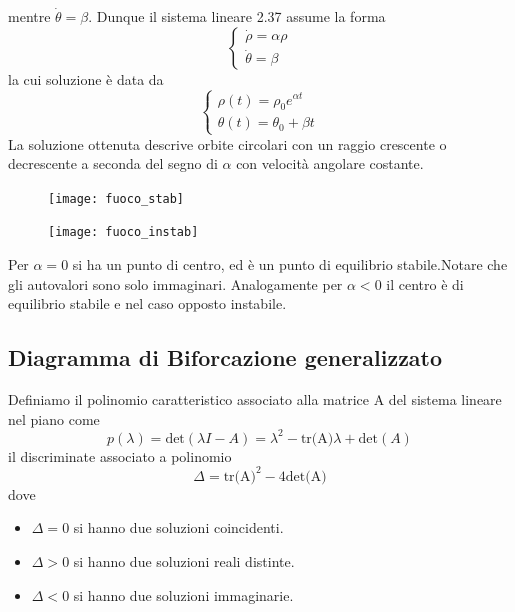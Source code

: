 mentre $\dot{\theta} = \beta$. Dunque il sistema lineare 2.37 assume la forma
\begin{equation}
	\left \{ \begin{array}{l}
		\dot{\rho} = \alpha \rho \\
		\dot{\theta} = \beta
	\end{array} \right.
\end{equation}
la cui soluzione \`{e} data da 
\begin{equation*}
	\left \{ \begin{array}{l}
		\rho(t) = \rho_0 e^{\alpha t}\\
		\theta(t) = \theta_0 + \beta t	
	\end{array} \right.
\end{equation*}
La soluzione ottenuta descrive orbite circolari con un raggio crescente o decrescente a seconda del segno di $\alpha$ con velocit\`{a} angolare costante.
\begin{figure}[!ht]
\centering
\begin{minipage}{.5\textwidth}
  \centering
  \texttt{[image: fuoco\_stab]}
  \end{minipage}%
\begin{minipage}{.5\textwidth}
  \centering
  \texttt{[image: fuoco\_instab]}
\end{minipage}
\end{figure}
Per $\alpha = 0$ si ha un punto di centro, ed \`{e} un punto di equilibrio stabile.Notare che gli autovalori sono solo immaginari. Analogamente per $\alpha < 0 $ il centro \`{e} di equilibrio stabile e nel caso opposto instabile.
\subsection{Diagramma di Biforcazione generalizzato}

Definiamo il polinomio caratteristico associato alla matrice A del sistema lineare nel piano come
\newpage
\begin{equation*}
	p(\lambda) = \text{det}(\lambda I - A) = \lambda^2 - \text{tr(A)}\lambda + \text{det}(A)	
\end{equation*}
il discriminate associato a polinomio 
\begin{equation*}
	\Delta = \text{tr(A)}^2 -4\text{det(A)}
\end{equation*}
dove 
\begin{itemize}
	\item $\Delta = 0$ si hanno due soluzioni coincidenti.
	\item $\Delta > 0$ si hanno due soluzioni reali distinte.
	\item $\Delta < 0$ si hanno due soluzioni immaginarie.
\end{itemize}

